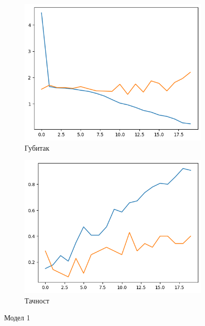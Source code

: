 \documentclass{article}
\begin{document}
\begin{figure}[htbp]
  \centering
  \begin{subfigure}{0.45\textwidth}
    \centering
    \includegraphics[width=\linewidth]{slike/1loss.png} %
    \caption{Губитак}
    \label{fig:slika1}
  \end{subfigure}
  \hfill
  \begin{subfigure}{0.45\textwidth}
    \centering
    \includegraphics[width=\linewidth]{slike/1acc.png} %
    \caption{Тачност}
    \label{fig:slika2}
  \end{subfigure}
  \caption{Модел 1}
  \label{fig:zajednicki_naslov}
\end{figure}
\end{document}
